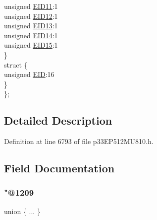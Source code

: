 \begin{DoxyCompactItemize}
\begin{tabbing}
\>\>unsigned \hyperlink{structtag_c2_r_x_f10_e_i_d_b_i_t_s_a710bdb0d602deb021b0be99066008018}{EID11}:1\\
\>\>unsigned \hyperlink{structtag_c2_r_x_f10_e_i_d_b_i_t_s_aa347bb85867bd8d4e0124f7cff8c6472}{EID12}:1\\
\>\>unsigned \hyperlink{structtag_c2_r_x_f10_e_i_d_b_i_t_s_a37d5f3edcbf6ef62f848fd4f3c584f79}{EID13}:1\\
\>\>unsigned \hyperlink{structtag_c2_r_x_f10_e_i_d_b_i_t_s_a7ffc0b0e0d99b8476b6f9a45337c17ab}{EID14}:1\\
\>\>unsigned \hyperlink{structtag_c2_r_x_f10_e_i_d_b_i_t_s_a293cd7dc1746257fa75a60cbd9383cd7}{EID15}:1\\
\>\} \\
\>struct \{\\
\>\>unsigned \hyperlink{structtag_c2_r_x_f10_e_i_d_b_i_t_s_ae80b378c9141f7c03e0b4e55b5f4b54d}{EID}:16\\
\>\} \\
\}; \\

\end{tabbing}\end{DoxyCompactItemize}


\subsection{Detailed Description}


Definition at line 6793 of file p33\+E\+P512\+M\+U810.\+h.



\subsection{Field Documentation}
\mbox{\label{structtag_c2_r_x_f10_e_i_d_b_i_t_s_acba91061b56814f6ae651b2fdb482e71}} 
\subsubsection{\texorpdfstring{"@1209}{@1209}}
{\footnotesize\ttfamily union \{ ... \} }

\mbox{\label{structtag_c2_r_x_f10_e_i_d_b_i_t_s_ae80b378c9141f7c03e0b4e55b5f4b54d}} 
